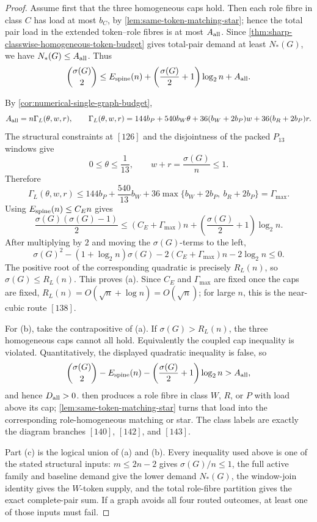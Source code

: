 \documentclass[11pt]{article}
\begin{document}
\begin{proof}
Assume first that the three homogeneous caps hold.  Then each role fibre in
class \(C\) has load at most \(b_C\), by
\cref{lem:same-token-matching-star}; hence the total pair load in the extended
token--role fibres is at most \(A_{\rm all}\).  Since
\cref{thm:sharp-classwise-homogeneous-token-budget} gives total-pair demand
at least \(N_*(G)\), we have \(N_*(G)\le A_{\rm all}\).  Thus
\[
\binom{\sigma(G)}2
\le
E_{\rm spine}(n)
+\left(\frac{\sigma(G)}2+1\right)\log_2 n
+A_{\rm all}.
\]

By \cref{cor:numerical-single-graph-budget},
\[
A_{\rm all}=n\Gamma_L(\theta,w,r),
\qquad
\Gamma_L(\theta,w,r)
=144b_P+540b_W\theta
+36(b_W+2b_P)w+36(b_R+2b_P)r .
\]
The structural constraints at \([126]\) and the disjointness of the packed
\(P_{13}\) windows give
\[
0\le\theta\le\frac1{13},\qquad
w+r=\frac{\sigma(G)}n\le1.
\]
Therefore
\[
\Gamma_L(\theta,w,r)
\le
144b_P+\frac{540}{13}b_W
+36\max\{b_W+2b_P,\ b_R+2b_P\}
=\Gamma_{\max}.
\]
Using \(E_{\rm spine}(n)\le C_En\) gives
\[
\frac{\sigma(G)(\sigma(G)-1)}2
\le
(C_E+\Gamma_{\max})n
+\left(\frac{\sigma(G)}2+1\right)\log_2 n .
\]
After multiplying by \(2\) and moving the \(\sigma(G)\)-terms to the left,
\[
\sigma(G)^2-(1+\log_2 n)\sigma(G)
-2(C_E+\Gamma_{\max})n-2\log_2 n
\le0 .
\]
The positive root of the corresponding quadratic is precisely \(R_L(n)\), so
\(\sigma(G)\le R_L(n)\).  This proves (a).  Since \(C_E\) and
\(\Gamma_{\max}\) are fixed once the caps are fixed,
\(R_L(n)=O(\sqrt n+\log n)=O(\sqrt n)\); for large \(n\), this is the
near-cubic route \([138]\).

For (b), take the contrapositive of (a).  If \(\sigma(G)>R_L(n)\), the three
homogeneous caps cannot all hold.  Equivalently the coupled cap inequality is
violated.  Quantitatively, the displayed quadratic inequality is false, so
\[
\binom{\sigma(G)}2
-E_{\rm spine}(n)
-\left(\frac{\sigma(G)}2+1\right)\log_2 n
>A_{\rm all},
\]
and hence \(D_{\rm all}>0\).   then
produces a role fibre in class \(W\), \(R\), or \(P\) with load above its cap;
\cref{lem:same-token-matching-star} turns that load into the corresponding
role-homogeneous matching or star.  The class labels are exactly the diagram
branches \([140]\), \([142]\), and \([143]\).

Part (c) is the logical union of (a) and (b).  Every inequality used above is
one of the stated structural inputs: \(m\le2n-2\) gives \(\sigma(G)/n\le1\),
the full active family and baseline demand give the lower demand \(N_*(G)\),
the window-join identity gives the \(W\)-token supply, and the total role-fibre
partition gives the exact complete-pair sum.  If a graph avoids all four routed
outcomes, at least one of those inputs must fail.
\end{proof}
\end{document}
